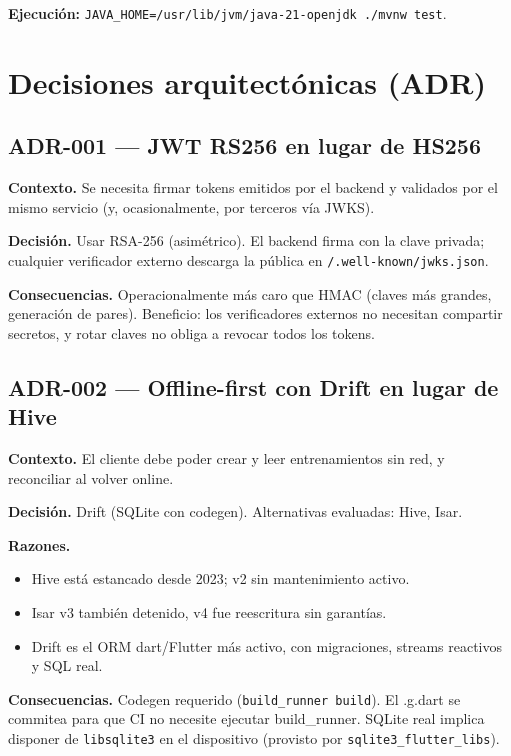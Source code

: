 \documentclass[11pt,a4paper]{article}
\begin{document}
\textbf{Ejecución:} \texttt{JAVA\_HOME=/usr/lib/jvm/java-21-openjdk ./mvnw test}.

\section{Decisiones arquitectónicas (ADR)}

\subsection{ADR-001 — JWT RS256 en lugar de HS256}

\textbf{Contexto.} Se necesita firmar tokens emitidos por el backend y validados por el mismo servicio (y, ocasionalmente, por terceros vía JWKS).

\textbf{Decisión.} Usar RSA-256 (asimétrico). El backend firma con la clave privada; cualquier verificador externo descarga la pública en \texttt{/.well-known/jwks.json}.

\textbf{Consecuencias.} Operacionalmente más caro que HMAC (claves más grandes, generación de pares). Beneficio: los verificadores externos no necesitan compartir secretos, y rotar claves no obliga a revocar todos los tokens.

\subsection{ADR-002 — Offline-first con Drift en lugar de Hive}

\textbf{Contexto.} El cliente debe poder crear y leer entrenamientos sin red, y reconciliar al volver online.

\textbf{Decisión.} Drift (SQLite con codegen). Alternativas evaluadas: Hive, Isar.

\textbf{Razones.}
\begin{itemize}[leftmargin=*]
  \item Hive está estancado desde 2023; v2 sin mantenimiento activo.
  \item Isar v3 también detenido, v4 fue reescritura sin garantías.
  \item Drift es el ORM dart/Flutter más activo, con migraciones, streams reactivos y SQL real.
\end{itemize}

\textbf{Consecuencias.} Codegen requerido (\texttt{build\_runner build}). El .g.dart se commitea para que CI no necesite ejecutar build\_runner. SQLite real implica disponer de \texttt{libsqlite3} en el dispositivo (provisto por \texttt{sqlite3\_flutter\_libs}).
\end{document}
